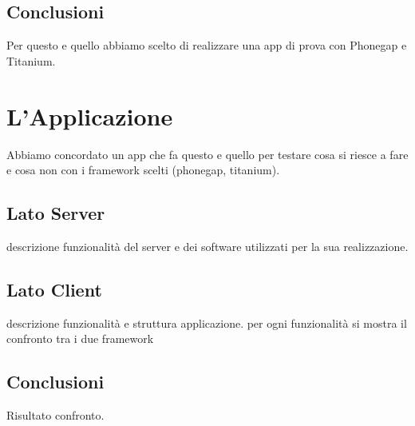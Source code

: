 	\section{Conclusioni}
		Per questo e quello abbiamo scelto di realizzare una app di prova con
		Phonegap e Titanium.


\chapter{L'Applicazione}
	Abbiamo concordato un app che fa questo e quello per testare cosa si riesce a
	fare e cosa non con i framework scelti (phonegap, titanium).
	\section{Lato Server}
	descrizione funzionalità del server e dei software utilizzati per la sua realizzazione.	
	\section{Lato Client}
	descrizione funzionalità e struttura applicazione. per ogni funzionalità si mostra il confronto 	tra i due
	framework
	\section{Conclusioni}
	Risultato confronto.